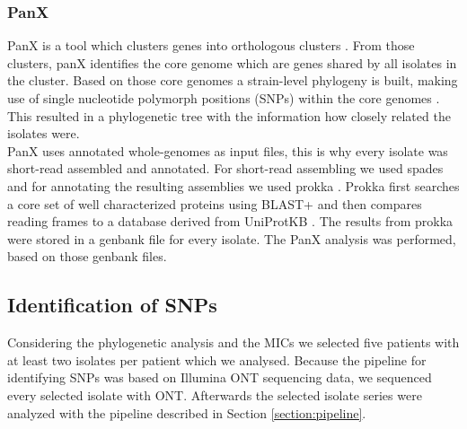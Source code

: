 \subsubsection{PanX}
PanX is a tool which clusters genes into orthologous clusters \cite{panx}. From those clusters, panX identifies the core genome which are genes shared by all isolates in the cluster. Based on those core genomes a strain-level phylogeny is built, making use of single nucleotide polymorph positions (SNPs) within the core genomes \cite{panX}. This resulted in a phylogenetic tree with the information how closely related the isolates were. \\ 
PanX uses annotated whole-genomes as input files, this is why every isolate was short-read assembled and annotated. For short-read assembling we used spades and for annotating the resulting assemblies we used prokka \cite{nurk_assembling_2013} \cite{seemann_prokka:_2014}. Prokka first searches a core set of well characterized proteins using BLAST+ and then compares reading frames to a database derived from UniProtKB \cite{seemann_:zap:_2019}. The results from prokka were stored in a genbank file for every isolate. The PanX analysis was performed, based on those genbank files. \\

\subsection{Identification of SNPs}
Considering the phylogenetic analysis and the MICs we selected five patients with at least two isolates per patient which we analysed. Because the pipeline for identifying SNPs was based on Illumina ONT sequencing data, we sequenced every selected isolate with ONT. 
Afterwards the selected isolate series were analyzed with the pipeline described in Section \ref{section:pipeline}.
